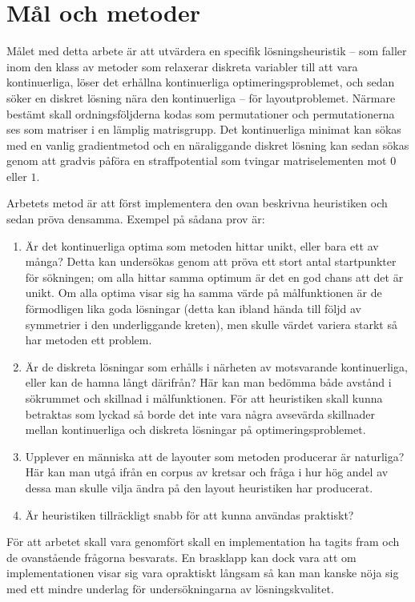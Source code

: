 \documentclass{article}
\begin{document}
\section{M\r{a}l och metoder}

M\r{a}let med detta arbete \"ar att utv\"ardera en specifik 
l\"osningsheuristik -- som faller inom den klass av metoder som 
relaxerar diskreta variabler till att vara kontinuerliga, l\"oser 
det erh\r{a}llna kontinuerliga optimeringsproblemet, och sedan s\"oker 
en diskret l\"osning n\"ara den kontinuerliga -- f\"or layoutproblemet. 
N\"armare best\"amt skall ordningsf\"oljderna kodas som 
permutationer och permutationerna ses som matriser i en l\"amplig 
matrisgrupp. Det kontinuerliga minimat kan s\"okas med en vanlig 
gradientmetod och en n\"araliggande diskret l\"osning kan sedan 
s\"okas genom att gradvis p\r{a}f\"ora en straffpotential som tvingar 
matriselementen mot $0$ eller $1$.

Arbetets metod \"ar att f\"orst implementera den ovan beskrivna 
heuristiken och sedan pr\"ova densamma. Exempel p\r{a} s\r{a}dana 
prov \"ar:
\begin{enumerate}
  \item
    \"Ar det kontinuerliga optima som metoden hittar unikt, eller 
    bara ett av m\r{a}nga? Detta kan unders\"okas genom att pr\"ova 
    ett stort antal startpunkter f\"or s\"okningen; om alla hittar 
    samma optimum \"ar det en god chans att det \"ar unikt. Om alla 
    optima visar sig ha samma v\"arde p\r{a} m\r{a}lfunktionen \"ar 
    de f\"ormodligen lika goda l\"osningar (detta kan ibland h\"anda 
    till f\"oljd av symmetrier i den underliggande kreten), men 
    skulle v\"ardet variera starkt s\r{a} har metoden ett problem.
  \item
    \"Ar de diskreta l\"osningar som erh\r{a}lls i n\"arheten av 
    motsvarande kontinuerliga, eller kan de hamna l\r{a}ngt 
    d\"arifr\r{a}n? H\"ar kan man bed\"omma b\r{a}de avst\r{a}nd 
    i s\"okrummet och skillnad i m\r{a}lfunktionen. F\"or att 
    heuristiken skall kunna betraktas som lyckad s\r{a} borde det 
    inte vara n\r{a}gra avsev\"arda skillnader mellan kontinuerliga 
    och diskreta l\"osningar p\r{a} optimeringsproblemet.
  \item
    Upplever en m\"anniska att de layouter som metoden producerar 
    \"ar naturliga? H\"ar kan man utg\r{a} ifr\r{a}n en corpus av 
    kretsar och fr\r{a}ga i hur h\"og andel av dessa man skulle vilja 
    \"andra p\r{a} den layout heuristiken har producerat.
  \item
    \"Ar heuristiken tillr\"ackligt snabb f\"or att kunna anv\"andas 
    praktiskt?
\end{enumerate}
F\"or att arbetet skall vara genomf\"ort skall en implementation ha 
tagits fram och de ovanst\r{a}ende fr\r{a}gorna besvarats. En 
brasklapp kan dock vara att om implementationen visar sig vara 
opraktiskt l\r{a}ngsam s\r{a} kan man kanske n\"oja sig med ett 
mindre underlag f\"or unders\"okningarna av l\"osningskvalitet.
\end{document}
